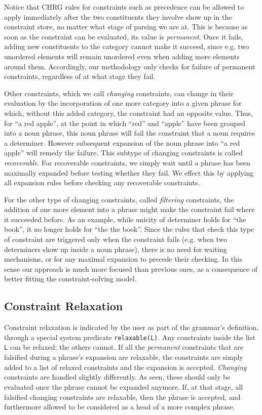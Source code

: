 \documentclass{llncs}
\begin{document}
Notice that CHRG rules  for constraints such as precedence can be allowed to apply  immediately after the two constituents they involve show up in the constraint store, no matter what stage of parsing we are at.  This is because as soon as the constraint can be evaluated, its value is \emph{permanent}. Once it fails, adding new constituents to the category cannot make it succeed, since e.g. two unordered elements will remain unordered even when adding more elements around them.  Accordingly, our methodology only checks for failure of permanent constraints, regardless of at what stage they fail.

Other constraints, which we call \emph{changing} constraints, can change in their  evaluation by the incorporation of one
more category into a given phrase for which, without this added category, the
constraint had an opposite value. Thus, for ``a red apple'',  at the point in which ``red'' and ``apple'' have been grouped into a noun phrase, this noun phrase will fail the constraint that a noun requires a determiner. However subsequent expansion of the noun phrase into ``a red apple'' will remedy the failure. This subtype of changing constraints is called \emph{recoverable}. For recoverable constraints, we simply wait until a phrase has been maximally expanded before testing whether they fail. We effect this by applying all expansion rules  before checking any recoverable constraints.

For the other type of changing constraints, called \emph{filtering} constraints, the addition of one more element into a phrase might make the constraint fail where it succeeded before. As an example, while unicity of determiner holds for ``the book'', it no longer holds for ``the the book''. Since the rules that check this type of constraint are triggered only when the constraint fails (e.g. when two determiners show up inside a noun phrase), there is no need for waiting mechanisms, or for any maximal expansion to precede their checking. In this sense our approach is much more focused than previous ones, as a consequence of better fitting the constraint-solving model. 


\subsection{Constraint Relaxation}

Constraint relaxation is indicated by the user as part of the grammar's definition, through a special system predicate \texttt{relaxable(L)}. Any constraints inside the list \texttt{L} can be relaxed; the others cannot. If all the \emph{permanent} constraints that are falsified during a phrase's expansion are relaxable, the constraints are simply added to a list of relaxed constraints and the expansion is accepted.  \emph{Changing} constraints are handled slightly differently. As seen, these should only be evaluated once the phrase cannot be expanded anymore. If, at that stage, all falsified changing constraints are relaxable, then the phrase is accepted, and furthermore allowed to be considered as a head of a more complex phrase.
\end{document}
